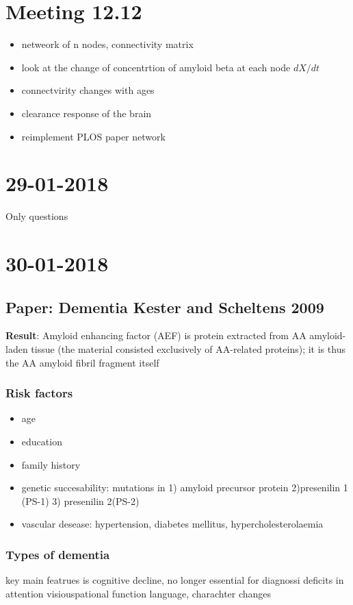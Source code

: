 \documentclass[fleqn]{article}\usepackage{caption}
\author{Anne-Lene Sax}
\date{\today}
\begin{document}
\section{Meeting 12.12}
\begin{itemize}
\item netweork of n nodes, connectivity matrix
\item look at the change of concentrtion of amyloid beta at each node $dX/dt$
\item connectvirity changes with ages
\item clearance response of the brain
\item reimplement PLOS paper network
\end{itemize}

\section{29-01-2018}
Only questions 


\section{30-01-2018}
\subsection{Paper: Dementia Kester and Scheltens 2009}
\textbf{Result}: Amyloid enhancing factor (AEF) is protein extracted from AA amyloid-laden tissue (the material consisted exclusively of AA-related proteins); it is thus the AA amyloid fibril fragment itself 

\subsubsection{Risk factors}
\begin{itemize}
\item age
\item education
\item family history
\item genetic succesability: mutations in 1) amyloid precursor protein 2)presenilin 1 (PS-1) 3) presenilin 2(PS-2)
\item vascular desease: hypertension, diabetes mellitus, hypercholesterolaemia
\end{itemize}

\subsubsection{Types of dementia}
key main featrues is cognitive decline, no longer essential for diagnossi
deficits in attention
visiouspational function 
language, charachter changes
\end{document}
